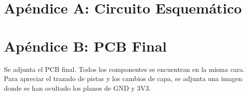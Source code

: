 \appendix
\appendixpage
\addappheadtotoc

\section*{Apéndice A: Circuito Esquemático}
\label{appendix:circuito_esquematico}

\begin{center}
    
\end{center}

\begin{center}
    
\end{center}

\begin{center}
    
\end{center}

\begin{center}
    
\end{center}

\begin{center}
    
\end{center}

\begin{center}
    
\end{center}


\section*{Apéndice B: PCB Final}
\label{appendix:PCB}

Se adjunta el PCB final. Todos los componentes se encuentran en la misma cara. Para apreciar el trazado de pistas y los cambios de capa, se adjunta una imagen donde se han ocultado los planos de GND y 3V3.

\begin{center}
    
\end{center}

